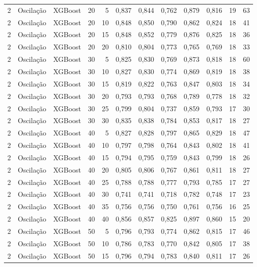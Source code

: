 \begin{longtable}{@{}rllrrrrrrrrr@{}}
2 & Oscilação & XGBoost & 20 & 5 & 0,837 & 0,844 & 0,762 & 0,879 & 0,816 & 19 & 63 \\
2 & Oscilação & XGBoost & 20 & 10 & 0,848 & 0,850 & 0,790 & 0,862 & 0,824 & 18 & 41 \\
2 & Oscilação & XGBoost & 20 & 15 & 0,848 & 0,852 & 0,779 & 0,876 & 0,825 & 18 & 36 \\
2 & Oscilação & XGBoost & 20 & 20 & 0,810 & 0,804 & 0,773 & 0,765 & 0,769 & 18 & 33 \\
2 & Oscilação & XGBoost & 30 & 5 & 0,825 & 0,830 & 0,769 & 0,873 & 0,818 & 18 & 60 \\
2 & Oscilação & XGBoost & 30 & 10 & 0,827 & 0,830 & 0,774 & 0,869 & 0,819 & 18 & 38 \\
2 & Oscilação & XGBoost & 30 & 15 & 0,819 & 0,822 & 0,763 & 0,847 & 0,803 & 18 & 34 \\
2 & Oscilação & XGBoost & 30 & 20 & 0,793 & 0,793 & 0,768 & 0,789 & 0,778 & 18 & 32 \\
2 & Oscilação & XGBoost & 30 & 25 & 0,799 & 0,804 & 0,737 & 0,859 & 0,793 & 17 & 30 \\
2 & Oscilação & XGBoost & 30 & 30 & 0,835 & 0,838 & 0,784 & 0,853 & 0,817 & 18 & 27 \\
2 & Oscilação & XGBoost & 40 & 5 & 0,827 & 0,828 & 0,797 & 0,865 & 0,829 & 18 & 47 \\
2 & Oscilação & XGBoost & 40 & 10 & 0,797 & 0,798 & 0,764 & 0,843 & 0,802 & 18 & 41 \\
2 & Oscilação & XGBoost & 40 & 15 & 0,794 & 0,795 & 0,759 & 0,843 & 0,799 & 18 & 26 \\
2 & Oscilação & XGBoost & 40 & 20 & 0,805 & 0,806 & 0,767 & 0,861 & 0,811 & 18 & 27 \\
2 & Oscilação & XGBoost & 40 & 25 & 0,788 & 0,788 & 0,777 & 0,793 & 0,785 & 17 & 27 \\
2 & Oscilação & XGBoost & 40 & 30 & 0,741 & 0,741 & 0,718 & 0,782 & 0,748 & 17 & 23 \\
2 & Oscilação & XGBoost & 40 & 35 & 0,756 & 0,756 & 0,750 & 0,761 & 0,756 & 16 & 25 \\
2 & Oscilação & XGBoost & 40 & 40 & 0,856 & 0,857 & 0,825 & 0,897 & 0,860 & 15 & 20 \\
2 & Oscilação & XGBoost & 50 & 5 & 0,796 & 0,793 & 0,774 & 0,862 & 0,815 & 17 & 46 \\
2 & Oscilação & XGBoost & 50 & 10 & 0,786 & 0,783 & 0,770 & 0,842 & 0,805 & 17 & 38 \\
2 & Oscilação & XGBoost & 50 & 15 & 0,796 & 0,794 & 0,783 & 0,840 & 0,811 & 17 & 26 \\

\end{longtable}
